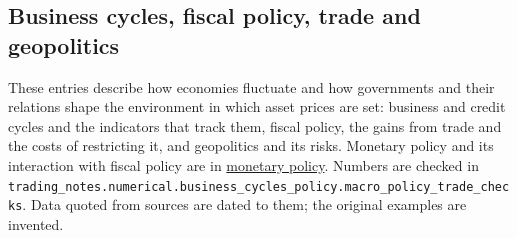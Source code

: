 \subsection{Business cycles, fiscal policy, trade and geopolitics}

These entries describe how economies fluctuate and how governments and their relations shape the environment in which asset prices are set: business and credit cycles and the indicators that track them, fiscal policy, the gains from trade and the costs of restricting it, and geopolitics and its risks. Monetary policy and its interaction with fiscal policy are in \hyperref[def:monetary-policy-transmission-regimes]{monetary policy}. Numbers are checked in \nolinkurl{trading_notes.numerical.business_cycles_policy.macro_policy_trade_checks}. Data quoted from sources are dated to them; the original examples are invented.

